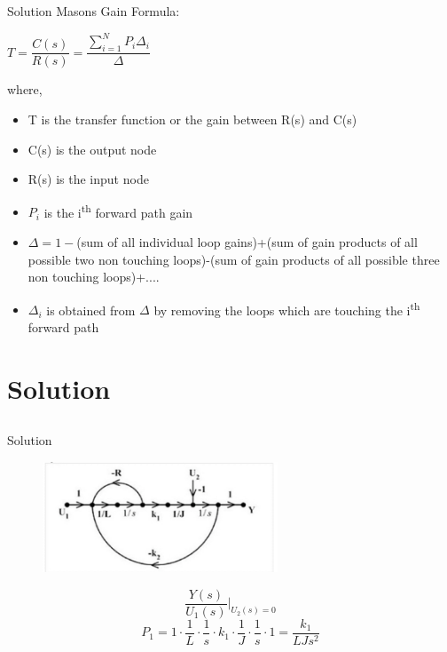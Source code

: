 \documentclass[10pt]{beamer}
\begin{document}
\subsection{}
\begin{frame}{Solution}
Masons Gain Formula:

$T=\dfrac{C(s)}{R(s)}=\dfrac{\sum_{i=1}^{N}P_i \Delta_i }{\Delta}$

where,
\begin{itemize}
    \item T is the transfer function or the gain between R(s) and C(s)
    \item C(s) is the output node
    \item R(s) is the input node
    \item $P_i$ is the i\textsuperscript{th} forward path gain
    \item $\Delta= 1 - $(sum of all individual loop gains)+(sum of gain products of all possible two non touching loops)-(sum of gain products of all possible three non touching loops)+.... 
    \item $\Delta_i$ is obtained from $\Delta$ by removing the loops which are touching the i\textsuperscript{th} forward path  
     
    
    
\end{itemize}


\end{frame}


\section{Solution}
\subsection{}
\begin{frame}{Solution}
\begin{figure}
    \centering
    \includegraphics[width=7cm]{image.jpg}

\end{figure}

\[
\dfrac{Y(s)}{U_1(s)}\Biggr|_{U_2(s)=0}
\]
\[
P_1=1\cdot\dfrac{1}{L}\cdot\dfrac{1}{s}\cdot k_1 \cdot\dfrac{1}{J}\cdot\dfrac{1}{s}\cdot1=\dfrac{k_1}{LJs^2}
\]


\end{frame}
\end{document}
